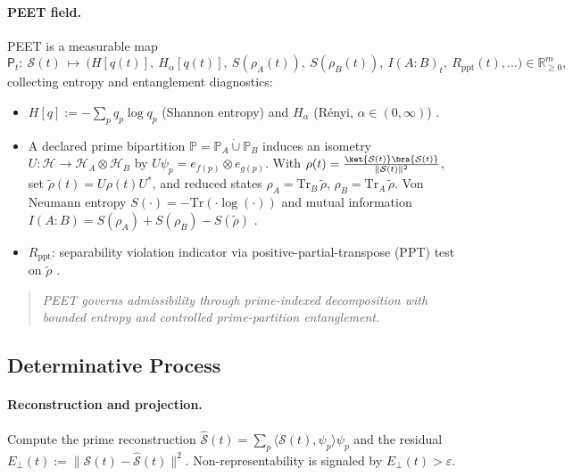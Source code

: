 \documentclass[12pt]{amsart}
\theoremstyle{plain}
\begin{document}
\paragraph{PEET field.}
PEET is a measurable map
\[
\mathsf{P}_t:\ \mathcal{S}(t)\ \longmapsto\ \big(H[q(t)],\ H_\alpha[q(t)],\ S(\rho_A(t)),\ S(\rho_B(t)),\ I(A{:}B)_t,\ R_{\mathrm{ppt}}(t),\ldots\big)\in\mathbb{R}_{\ge0}^m,
\]
collecting entropy and entanglement diagnostics:
\begin{itemize}
  \item $H[q]:=-\sum_{p} q_p\log q_p$ (Shannon entropy) and $H_\alpha$ (Rényi, $\alpha\in(0,\infty)$) \cite{cover2006elements}.
  \item A declared prime bipartition ${\mathbb{P}}={\mathbb{P}}_A\dot{\cup}{\mathbb{P}}_B$ induces an isometry $U:\mathcal{H}\to\mathcal{H}_A\otimes\mathcal{H}_B$ by $U\psi_p=e_{f(p)}\otimes e_{g(p)}$. With $\rho(t)=\frac{\ket{\mathcal{S}(t)}\bra{\mathcal{S}(t)}}{\|\mathcal{S}(t)\|^2}$, set $\tilde\rho(t)=U\rho(t)U^\ast$, and reduced states $\rho_A=\mathrm{Tr}_B\,\tilde\rho$, $\rho_B=\mathrm{Tr}_A\,\tilde\rho$. Von Neumann entropy $S(\cdot)=-\mathrm{Tr}(\cdot\log(\cdot))$ and mutual information $I(A{:}B)=S(\rho_A)+S(\rho_B)-S(\tilde\rho)$ \cite{nielsen2010quantum}.
  \item $R_{\mathrm{ppt}}$: separability violation indicator via positive-partial-transpose (PPT) test on $\tilde\rho$ \cite{peres1996separability,horodecki1996separability}.
\end{itemize}

\begin{quote}
\textit{PEET governs admissibility through prime-indexed decomposition with bounded entropy and controlled prime-partition entanglement.}
\end{quote}

\subsection{Determinative Process}

\paragraph{Reconstruction and projection.}
Compute the prime reconstruction $\widehat{\mathcal{S}}(t)=\sum_{p}\langle \mathcal{S}(t),\psi_p\rangle\psi_p$ and the residual $E_\perp(t):=\|\mathcal{S}(t)-\widehat{\mathcal{S}}(t)\|^2$. Non-representability is signaled by $E_\perp(t)>\varepsilon$.
\end{document}
